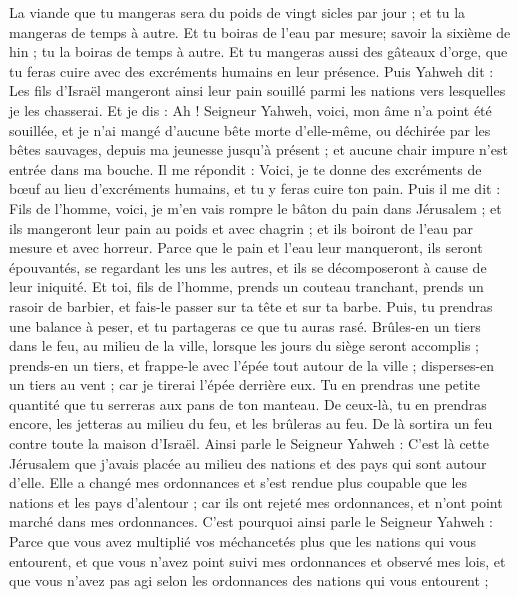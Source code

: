 \begin{multicols}{2}
La viande que tu mangeras sera du poids de vingt sicles par jour ; et tu la mangeras de temps à autre.
Et tu boiras de l'eau par mesure; savoir la sixième de hin ; tu la boiras de temps à autre.
Et tu mangeras aussi des gâteaux d'orge, que tu feras cuire avec des excréments humains en leur présence.
Puis Yahweh dit : Les fils d'Israël mangeront ainsi leur pain souillé parmi les nations vers lesquelles je les chasserai.
Et je dis : Ah ! Seigneur Yahweh, voici, mon âme n'a point été souillée, et je n'ai mangé d'aucune bête morte d'elle-même, ou déchirée par les bêtes sauvages, depuis ma jeunesse jusqu'à présent ; et aucune chair impure n'est entrée dans ma bouche.
Il me répondit : Voici, je te donne des excréments de bœuf au lieu d'excréments humains, et tu y feras cuire ton pain.
Puis il me dit : Fils de l'homme, voici, je m'en vais rompre le bâton du pain dans Jérusalem ; et ils mangeront leur pain au poids et avec chagrin ; et ils boiront de l'eau par mesure et avec horreur.
Parce que le pain et l'eau leur manqueront, ils seront épouvantés, se regardant les uns les autres, et ils se décomposeront à cause de leur iniquité.
\VerseOne{}Et toi, fils de l'homme, prends un couteau tranchant, prends un rasoir de barbier, et fais-le passer sur ta tête et sur ta barbe. Puis, tu prendras une balance à peser, et tu partageras ce que tu auras rasé.
Brûles-en un tiers dans le feu, au milieu de la ville, lorsque les jours du siège seront accomplis ; prends-en un tiers, et frappe-le avec l'épée tout autour de la ville ; disperses-en un tiers au vent ; car je tirerai l'épée derrière eux.
Tu en prendras une petite quantité que tu serreras aux pans de ton manteau.
De ceux-là, tu en prendras encore, les jetteras au milieu du feu, et les brûleras au feu. De là sortira un feu contre toute la maison d'Israël.
Ainsi parle le Seigneur Yahweh : C'est là cette Jérusalem que j'avais placée au milieu des nations et des pays qui sont autour d'elle.
Elle a changé mes ordonnances et s'est rendue plus coupable que les nations et les pays d'alentour ; car ils ont rejeté mes ordonnances, et n'ont point marché dans mes ordonnances.
C'est pourquoi ainsi parle le Seigneur Yahweh : Parce que vous avez multiplié vos méchancetés plus que les nations qui vous entourent, et que vous n'avez point suivi mes ordonnances et observé mes lois, et que vous n'avez pas agi selon les ordonnances des nations qui vous entourent ;

\end{multicols}
